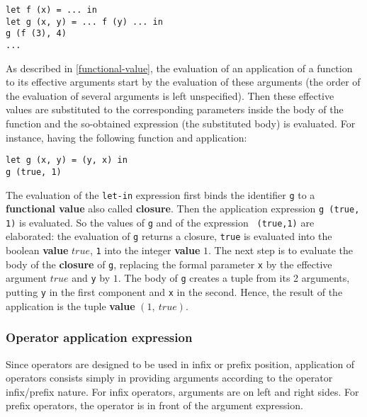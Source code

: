 {\scriptsize
\begin{lstlisting}
let f (x) = ... in
let g (x, y) = ... f (y) ... in
g (f (3), 4)
...
\end{lstlisting}}

As described in \ref{functional-value}, the evaluation of an
application of a function to its effective arguments start by the
evaluation of these arguments (the order of the evaluation of several
arguments is left unspecified). Then these effective values are
substituted to the corresponding parameters inside the body of the
function and the so-obtained expression (the substituted body) is
evaluated.  For instance, having the
following function and application:

{\scriptsize
\begin{lstlisting}
let g (x, y) = (y, x) in
g (true, 1)
\end{lstlisting}}

The evaluation of the {\tt let-in} expression first binds the
identifier {\tt g} to a {\bf functional value} also called {\bf
  closure}. Then the application expression {\tt g (true, 1)} is
evaluated. So the values of {\tt g} and of the expression {\tt
  (true,1)} are elaborated: the evaluation of {\tt g} returns a
closure, {\tt true} is evaluated into the boolean {\bf value} $true$,
{\tt 1} into the integer {\bf value} $1$. The next step is to evaluate
the body of the {\bf closure} of {\tt g}, replacing the formal
parameter {\tt x} by the effective argument $true$ and {\tt y} by
$1$. The body of {\tt g} creates a tuple from its 2 arguments, putting
{\tt y} in the first component and {\tt x} in the second. Hence, the
result of the application is the tuple {\bf value} $(1,\ true)$.



\subsubsection{Operator application expression}
Since operators are designed to be used in infix or prefix position,
application of operators consists simply in providing arguments
according to the operator infix/prefix nature. For infix operators,
arguments are on left and right sides. For prefix operators, the
operator is in front of the argument expression.



